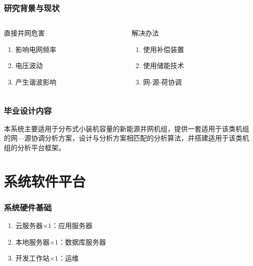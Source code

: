 \documentclass[aspectratio=169, 10pt, utf8, mathserif]{beamer}
\begin{document}
	
	\begin{frame}
		\frametitle{研究背景与现状}
		
		\begin{columns}
			\begin{column}{.5\linewidth}
				直接并网危害
				\begin{enumerate}
					\item 影响电网频率
					\item 电压波动
					\item 产生谐波影响
				\end{enumerate}
			\end{column}
			
			\begin{column}{.5\linewidth}
				解决办法
				\begin{enumerate}
					\item 使用补偿装置
					\item 使用储能技术
					\item 网-源-荷协调
				\end{enumerate}
			\end{column}
		\end{columns}
		
	\end{frame}
	
	
	\begin{frame}
		\frametitle{毕业设计内容}
		\zihao{3}
		本系统主要适用于分布式小装机容量的新能源并网机组，提供一套适用于该类机组的网—源协调分析方案，设计与分析方案相匹配的分析算法，并搭建适用于该类机组的分析平台框架。
	\end{frame}


	\section{系统软件平台}
	
	\begin{frame}
		\frametitle{系统硬件基础}
		\begin{enumerate}
			\item 云服务器$ \times 1$：应用服务器
			\item 本地服务器$ \times 1$：数据库服务器
			\item 开发工作站$ \times 1$：运维
		\end{enumerate}
		
	\end{frame}
\end{document}
